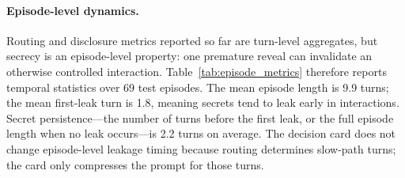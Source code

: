 \documentclass[11pt]{article}
\begin{document}
\begin{table}[t]
\centering
\caption{Summary comparison across all systems ($n{=}683$ val turns). Routing metrics (F1, unsafe FP, cost) apply to predictor+router pipeline; generation metrics (policy consistency, over-disclosure, ROUGE-L) apply to response quality.}
\label{tab:summary_comparison}
\small
{}
\end{table}

\paragraph{Episode-level dynamics.}
Routing and disclosure metrics reported so far are turn-level aggregates, but secrecy is an episode-level property: one premature reveal can invalidate an otherwise controlled interaction. Table~\ref{tab:episode_metrics} therefore reports temporal statistics over 69 test episodes. The mean episode length is 9.9 turns; the mean first-leak turn is 1.8, meaning secrets tend to leak early in interactions. Secret persistence---the number of turns before the first leak, or the full episode length when no leak occurs---is 2.2 turns on average. The decision card does not change episode-level leakage timing because routing determines slow-path turns; the card only compresses the prompt for those turns.

\begin{table}[t]
\centering
\caption{Episode-level temporal metrics ($n{=}69$ episodes).}
\label{tab:episode_metrics}
\small
{}
\end{table}
\end{document}

